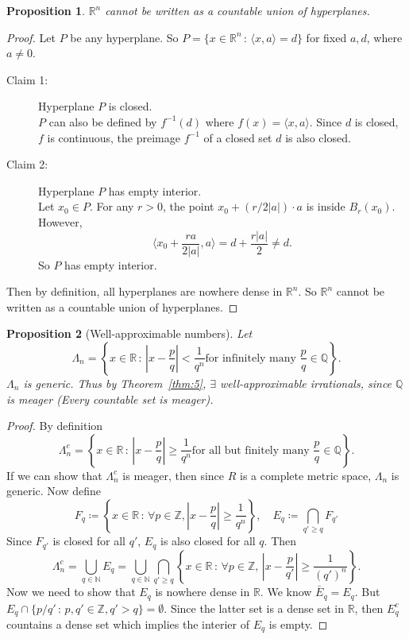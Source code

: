 \documentclass[12pt]{article}
\theoremstyle{plain}
\newtheorem*{prop}{Proposition}
\theoremstyle{definition}
\begin{document}
\begin{prop}
    $\mathbb{R}^n$ cannot be written as a countable union of hyperplanes.
\end{prop}

\begin{proof}
    Let $P$ be any hyperplane. So
    $P=\{x\in\mathbb{R}^n\,:\,\langle x,a\rangle=d\}$ for fixed $a, d$, where
    $a\neq 0$.
    \begin{description}
        \item[Claim 1:]
            Hyperplane $P$ is closed.\\
            $P$ can also be defined by $f^{-1}(d)$ where $f(x)=\langle
            x,a\rangle$.
            Since $d$ is closed, $f$ is continuous, the preimage $f^{-1}$ of a
            closed set $d$ is also closed.
        \item[Claim 2:]
            Hyperplane $P$ has empty interior.\\
            Let $x_0\in P$.
            For any $r>0$,
            the point $x_0+(r/2|a|)\cdot a$ is inside $B_r(x_0)$.
            However,
            $$\langle x_0+\frac{ra}{2|a|},a\rangle=d+\frac{r|a|}{2}\neq d.$$
            So $P$ has empty interior.
    \end{description}
    Then by definition, all hyperplanes are nowhere dense in $\mathbb{R}^n$.
    So $\mathbb{R}^n$ cannot be written as a countable union of hyperplanes.
\end{proof}

\begin{prop}[Well-approximable numbers]
    Let 
    $$\Lambda_n=\left\{x\in\mathbb{R}\,:\,\left|x-\frac{p}{q}\right|<\frac{1}{q^n}\text{
        for infinitely many }\frac{p}{q}\in\mathbb{Q}\right\}.$$
    $\Lambda_n$ is generic.
    Thus by Theorem~\ref{thm:5}, $\exists$ well-approximable irrationals, since
    $\mathbb{Q}$ is meager (Every countable set is meager).
\end{prop}
\begin{proof}
    By definition
    $$\Lambda_n^c=\left\{x\in\mathbb{R}\,:\,\left|x-\frac{p}{q}\right|\geq\frac{1}{q^n}\text{
        for all but finitely many }\frac{p}{q}\in\mathbb{Q}\right\}.$$
    If we can show that $\Lambda_n^c$ is meager, then since $R$ is a complete
    metric space, $\Lambda_n$ is generic.
    Now define
    $$
    F_q\coloneqq\left\{x\in\mathbb{R}\,:\,\forall p\in\mathbb{Z},
    \left|x-\frac{p}{q}\right|\geq\frac{1}{q^n}\right\},\quad
    E_q\coloneqq\bigcap_{q'\geq q}F_{q'}$$
    Since $F_{q'}$ is closed for all $q'$, $E_q$ is also closed for all $q$.
    Then 
    $$\Lambda_n^c=\bigcup_{q\in\mathbb{N}}E_q
    =\bigcup_{q\in\mathbb{N}}\bigcap_{q'\geq q}\left\{x\in\mathbb{R}\,:\,
    \forall
    p\in\mathbb{Z},\,\left|x-\frac{p}{q'}\right|\geq\frac{1}{(q')^n}\right\}.
    $$
    Now we need to show that $E_q$ is nowhere dense in $\mathbb{R}$.
    We know $\bar{E}_q=E_q$.
    But $E_q\cap\{p/q'\,:\,p,q'\in\mathbb{Z}, q'>q\}=\emptyset$.
    Since the latter set is a dense set in $\mathbb{R}$, then $E_q^c$ countains
    a dense set which implies the interier of $E_q$ is empty.
\end{proof}
\end{document}
